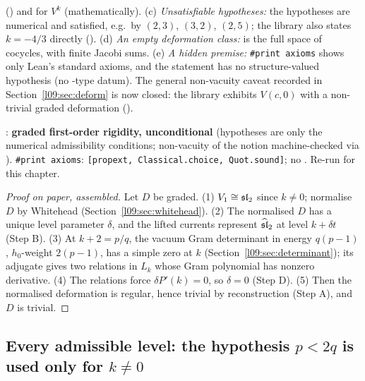 \begin{dictionary}
() and for $V^k$ (mathematically). (c) \emph{Unsatisfiable
hypotheses:} the hypotheses are numerical and satisfied, e.g.\ by $(2,3)$, $(3,2)$, $(2,5)$; the
library also states $k=-4/3$ directly (). (d) \emph{An empty deformation
class:}  is the full space of cocycles, with finite Jacobi sums. (e)
\emph{A hidden premise:} \texttt{\#print axioms} shows only Lean's standard axioms, and the statement
has no structure-valued hypothesis (no -type datum). The general
non-vacuity caveat recorded in Section~\ref{l09:sec:deform} is now closed: the library exhibits $V(c,0)$ with a
non-trivial graded deformation (\allowbreak{}\allowbreak{}\allowbreak{}\allowbreak{}).
\end{dictionary}

\begin{status}
: \textbf{graded first-order
rigidity, unconditional} (hypotheses are only the numerical admissibility conditions; non-vacuity of the
notion machine-checked via \allowbreak{}\allowbreak{}\allowbreak{}\allowbreak{}). \texttt{\#print axioms}:
\texttt{[propext, Classical.choice, Quot.sound]}; no . Re-run for this chapter.
\end{status}

\begin{proof}[Proof on paper, assembled]
Let $D$ be graded. (1) $V_1\cong\mathfrak{sl}_2$ since $k\neq0$; normalise $D$ by Whitehead
(Section~\ref{l09:sec:whitehead}). (2) The normalised $D$ has a unique level parameter $\delta$, and the
lifted currents represent $\widehat{\mathfrak{sl}}_2$ at level $k+\delta t$ (Step B). (3) At $k+2 = p/q$, the vacuum Gram
determinant in energy $q(p-1)$, $h_0$-weight $2(p-1)$, has a simple zero at $k$
(Section~\ref{l09:sec:determinant}); its adjugate gives two relations in $L_k$ whose Gram polynomial has
nonzero derivative. (4) The relations force $\delta P'(k) = 0$, so $\delta=0$ (Step D). (5) Then the
normalised deformation is regular, hence trivial by reconstruction (Step A), and $D$ is trivial.
\end{proof}

\subsection{Every admissible level: the hypothesis \texorpdfstring{$p<2q$}{p<2q} is used only for \texorpdfstring{$k\ne0$}{k != 0}}\label{l09:sec:alladmissible}

